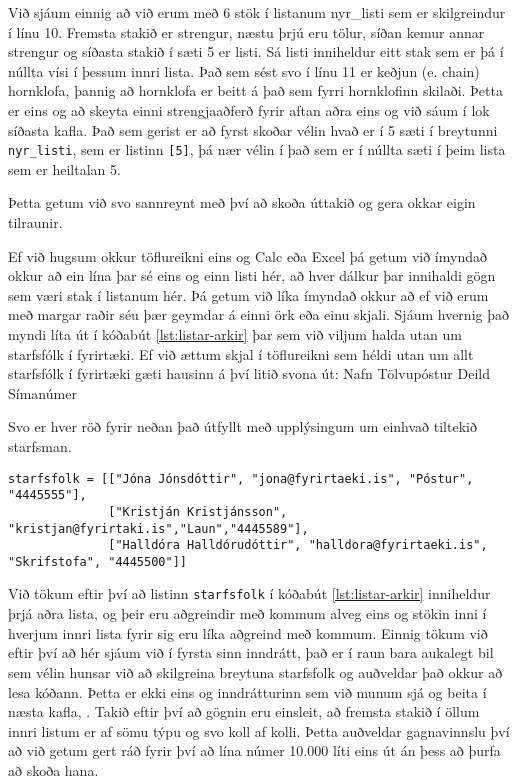 Við sjáum einnig að við erum með 6 stök í listanum nyr\_listi sem er skilgreindur í línu 10.
Fremsta stakið er strengur, næstu þrjú eru tölur, síðan kemur annar strengur og síðasta stakið í sæti 5 er listi.
Sá listi inniheldur eitt stak sem er þá í núllta vísi í þessum innri lista.
Það sem sést svo í línu 11 er keðjun (e. chain) hornklofa, þannig að hornklofa er beitt á það sem fyrri hornklofinn skilaði.
Þetta er eins og að skeyta einni strengjaaðferð fyrir aftan aðra eins og við sáum í lok síðasta kafla.
Það sem gerist er að fyrst skoðar vélin hvað er í 5 sæti í breytunni \texttt{nyr\_listi}, sem er listinn \texttt{[5]}, þá nær vélin í það sem er í núllta sæti í þeim lista sem er heiltalan 5.

Þetta getum við svo sannreynt með því að skoða úttakið og gera okkar eigin tilraunir.


Ef við hugsum okkur töflureikni eins og Calc eða Excel þá getum við ímyndað okkur að ein lína þar sé eins og einn listi hér, að hver dálkur þar innihaldi gögn sem væri stak í listanum hér.
Þá getum við líka ímyndað okkur að ef við erum með margar raðir séu þær geymdar á einni örk eða einu skjali.
Sjáum hvernig það myndi líta út í kóðabút \ref{lst:listar-arkir} þar sem við viljum halda utan um starfsfólk í fyrirtæki.
Ef við ættum skjal í töflureikni sem héldi utan um allt starfsfólk í fyrirtæki gæti hausinn á því litið svona út: Nafn \hspace{0.1cm} Tölvupóstur \hspace{0.1cm}Deild\hspace{0.1cm} Símanúmer 

Svo er hver röð fyrir neðan það útfyllt með upplýsingum um einhvað tiltekið starfsman.

\begin{lstlisting}[caption=Listar af listum, label=lst:listar-arkir]
starfsfolk = [["Jóna Jónsdóttir", "jona@fyrirtaeki.is", "Póstur", "4445555"],
			  ["Kristján Kristjánsson", "kristjan@fyrirtaki.is","Laun","4445589"],
			  ["Halldóra Halldórudóttir", "halldora@fyrirtaeki.is", "Skrifstofa", "4445500"]]

\end{lstlisting}

Við tökum eftir því að listinn \texttt{starfsfolk} í kóðabút \ref{lst:listar-arkir} inniheldur þrjá aðra lista, og þeir eru aðgreindir með kommum alveg eins og stökin inni í hverjum innri lista fyrir sig eru líka aðgreind með kommum.
Einnig tökum við eftir því að hér sjáum við í fyrsta sinn inndrátt, það er í raun bara aukalegt bil sem vélin hunsar við að skilgreina breytuna starfsfolk og auðveldar það okkur að lesa kóðann.
Þetta er ekki eins og inndrátturinn sem við munum sjá og beita í næsta kafla, .
Takið eftir því að gögnin eru einsleit, að fremsta stakið í öllum innri listum er af sömu týpu og svo koll af kolli.
Þetta auðveldar gagnavinnslu því að við getum gert ráð fyrir því að lína númer 10.000 líti eins út án þess að þurfa að skoða hana.
 
